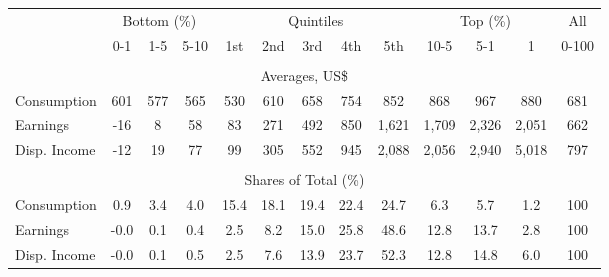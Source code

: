 \begin{tabular}{l c c c| c c c c c| c c c| c}
\toprule
&\multicolumn{3}{c|}{Bottom (\%)} & \multicolumn{5}{c|}{Quintiles} & \multicolumn{3}{c|}{Top (\%)} & All  \\
& 0-1 & 1-5 & 5-10 &  1st & 2nd & 3rd & 4th & 5th & 10-5 & 5-1 & 1 & 0-100 \\
\midrule \\
\multicolumn{13}{c}{Averages, US\$} \\
\midrule
Consumption  & 601  & 577  & 565  & 530  & 610  & 658  & 754  & 852  & 868  & 967  & 880  & 681 \\
Earnings         & -16 & 8 & 58 & 83 & 271 & 492 & 850 & 1,621 & 1,709 & 2,326 & 2,051 & 662 \\
Disp. Income & -12 & 19 & 77 & 99 & 305 & 552 & 945 & 2,088 & 2,056 & 2,940 & 5,018 & 797 \\
\midrule \\
\multicolumn{13}{c}{Shares of Total (\%)} \\
\midrule
Consumption  & 0.9   & 3.4   & 4.0   & 15.4   & 18.1   & 19.4   & 22.4   & 24.7   & 6.3   & 5.7   & 1.2   & 100 \\
Earnings         & -0.0  & 0.1  & 0.4  & 2.5  & 8.2  & 15.0  & 25.8  & 48.6  & 12.8  & 13.7  & 2.8  & 100 \\
Disp. Income & -0.0  & 0.1  & 0.5  & 2.5  & 7.6  & 13.9  & 23.7  & 52.3  & 12.8  & 14.8  & 6.0  & 100 \\
\bottomrule
\end{tabular}
